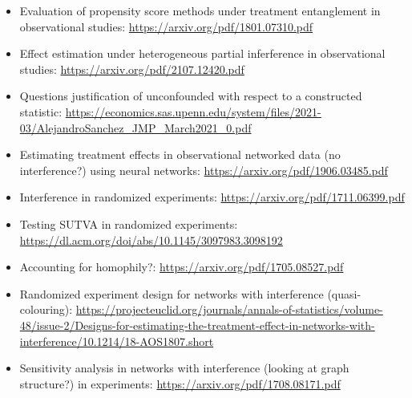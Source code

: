 \documentclass[10pt]{article}
\begin{document}
\begin{itemize}

\item
Evaluation of propensity score methods under treatment entanglement in observational studies: \url{https://arxiv.org/pdf/1801.07310.pdf}

\item
Effect estimation under heterogeneous partial inferference in observational studies: \url{https://arxiv.org/pdf/2107.12420.pdf}

\item
Questions justification of unconfounded with respect to a constructed statistic: \url{https://economics.sas.upenn.edu/system/files/2021-03/AlejandroSanchez_JMP_March2021_0.pdf}

\item
Estimating treatment effects in observational networked data (no interference?) using neural networks: \url{https://arxiv.org/pdf/1906.03485.pdf}

\item
Interference in randomized experiments: \url{https://arxiv.org/pdf/1711.06399.pdf}

\item
Testing SUTVA in randomized experiments: \url{https://dl.acm.org/doi/abs/10.1145/3097983.3098192}

\item
Accounting for homophily?: \url{https://arxiv.org/pdf/1705.08527.pdf}

\item
Randomized experiment design for networks with interference (quasi-colouring): \url{https://projecteuclid.org/journals/annals-of-statistics/volume-48/issue-2/Designs-for-estimating-the-treatment-effect-in-networks-with-interference/10.1214/18-AOS1807.short}

\item
Sensitivity analysis in networks with interference (looking at graph structure?) in experiments: \url{https://arxiv.org/pdf/1708.08171.pdf}


\end{itemize}


\newpage

\printbibliography
\end{document}
